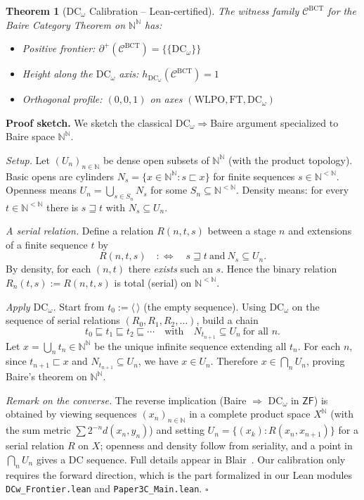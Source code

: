 \documentclass[11pt]{article}
\newtheorem{theorem}{Theorem}[section]
\newenvironment{proof}[1][Proof]{\noindent\textbf{#1.}\hspace{0.5em}}{\hfill$\square$\par}
\newcommand{\N}{\mathbb{N}}
\newcommand{\WLPO}{\mathrm{WLPO}}
\newcommand{\FT}{\mathrm{FT}}
\newcommand{\DCw}{\mathrm{DC}_\omega}
\newcommand{\BCT}{\mathrm{BCT}}
\newcommand{\Frontierpos}{\partial^{+}}
\begin{document}
\begin{theorem}[$\DCw{}$ Calibration -- Lean-certified]\label{thm:dcw-calib}
The witness family $\mathcal{C}^{\BCT}$ for the Baire Category Theorem on $\N^\N$ has:
\begin{itemize}
\item Positive frontier: $\Frontierpos(\mathcal{C}^{\BCT}) = \{\{\DCw\}\}$
\item Height along the $\DCw{}$ axis: $h_{\DCw}(\mathcal{C}^{\BCT}) = 1$
\item Orthogonal profile: $(0, 0, 1)$ on axes $(\WLPO, \FT, \DCw)$
\end{itemize}
\end{theorem}

\begin{proof}[Proof sketch]
We sketch the classical $\DCw\Rightarrow$Baire argument specialized to Baire space $\N^\N$.

\emph{Setup.} Let $(U_n)_{n\in\N}$ be dense open subsets of $\N^\N$ (with the product topology).
Basic opens are cylinders $N_s=\{x\in\N^\N : s\sqsubset x\}$ for finite sequences $s\in\N^{<\N}$.
Openness means $U_n=\bigcup_{s\in S_n} N_s$ for some $S_n\subseteq\N^{<\N}$. Density means:
for every $t\in\N^{<\N}$ there is $s\sqsupseteq t$ with $N_s\subseteq U_n$.

\emph{A serial relation.} Define a relation $R(n,t,s)$ between a stage $n$ and extensions of a
finite sequence $t$ by
\[
R(n,t,s)\quad:\Longleftrightarrow\quad s\sqsupseteq t\ \text{and}\ N_s\subseteq U_n.
\]
By density, for each $(n,t)$ there \emph{exists} such an $s$. Hence the binary relation
$R_n(t,s):=R(n,t,s)$ is total (serial) on $\N^{<\N}$.

\emph{Apply $\DCw$.} Start from $t_0:=\langle\,\rangle$ (the empty sequence). Using $\DCw$ on
the sequence of serial relations $(R_0,R_1,R_2,\dots)$, build a chain
\[
t_0\sqsubseteq t_1\sqsubseteq t_2\sqsubseteq \cdots
\quad\text{with}\quad N_{t_{n+1}}\subseteq U_n\ \text{for all }n.
\]
Let $x=\bigcup_{n} t_n\in\N^\N$ be the unique infinite sequence extending all $t_n$. For each $n$,
since $t_{n+1}\sqsubset x$ and $N_{t_{n+1}}\subseteq U_n$, we have $x\in U_n$. Therefore
$x\in\bigcap_n U_n$, proving Baire's theorem on $\N^\N$.

\emph{Remark on the converse.} The reverse implication (Baire $\Rightarrow$ $\DCw$ in $\mathsf{ZF}$)
is obtained by viewing sequences $(x_n)_{n\in\N}$ in a complete product space $X^\N$ (with the sum
metric $\sum 2^{-n}d(x_n,y_n)$) and setting $U_n=\{(x_k): R(x_n,x_{n+1})\}$ for a serial relation
$R$ on $X$; openness and density follow from seriality, and a point in $\bigcap_n U_n$ gives a DC
sequence. Full details appear in Blair~\cite{Blair77}. Our calibration only requires the forward
direction, which is the part formalized in our Lean modules \texttt{DCw\_Frontier.lean} and \texttt{Paper3C\_Main.lean}.
\end{proof}
\end{document}
